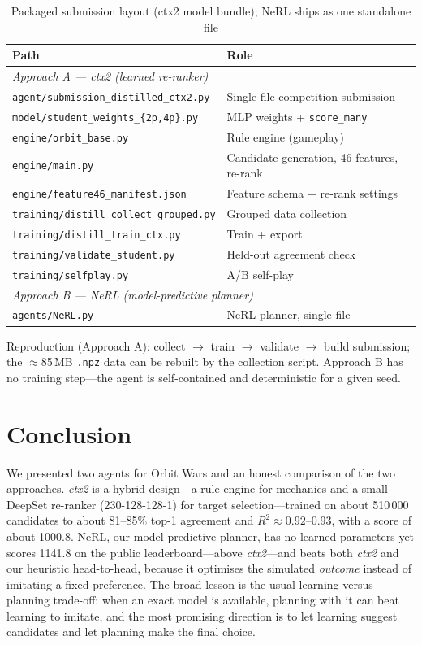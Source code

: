 \documentclass[conference]{IEEEtran}
\begin{document}
\begin{table}[htbp]
\caption{Packaged submission layout (ctx2 model bundle); NeRL ships as one standalone file}
\label{tab:files}
\centering
\small
\begin{tabular}{lp{5.4cm}}
\toprule
\textbf{Path} & \textbf{Role} \\
\midrule
\multicolumn{2}{l}{\textit{Approach A --- ctx2 (learned re-ranker)}} \\
\texttt{agent/submission\_distilled\_ctx2.py} & Single-file competition submission \\
\texttt{model/student\_weights\_\{2p,4p\}.py} & MLP weights + \texttt{score\_many} \\
\texttt{engine/orbit\_base.py} & Rule engine (gameplay) \\
\texttt{engine/main.py} & Candidate generation, 46 features, re-rank \\
\texttt{engine/feature46\_manifest.json} & Feature schema + re-rank settings \\
\texttt{training/distill\_collect\_grouped.py} & Grouped data collection \\
\texttt{training/distill\_train\_ctx.py} & Train + export \\
\texttt{training/validate\_student.py} & Held-out agreement check \\
\texttt{training/selfplay.py} & A/B self-play \\
\midrule
\multicolumn{2}{l}{\textit{Approach B --- NeRL (model-predictive planner)}} \\
\texttt{agents/NeRL.py} & NeRL planner, single file \\
\bottomrule
\end{tabular}
\end{table}

Reproduction (Approach A): collect $\rightarrow$ train $\rightarrow$ validate $\rightarrow$ build submission; the $\approx$85\,MB \texttt{.npz} data can be rebuilt by the collection script. Approach B has no training step---the agent is self-contained and deterministic for a given seed.

\section{Conclusion}

We presented two agents for Orbit Wars and an honest comparison of the two approaches. \textit{ctx2} is a hybrid design---a rule engine for mechanics and a small DeepSet re-ranker (230-128-128-1) for target selection---trained on about 510\,000 candidates to about 81--85\% top-1 agreement and $R^2 \approx 0.92$--0.93, with a score of about 1000.8. NeRL, our model-predictive planner, has no learned parameters yet scores 1141.8 on the public leaderboard---above \textit{ctx2}---and beats both \textit{ctx2} and our heuristic head-to-head, because it optimises the simulated \emph{outcome} instead of imitating a fixed preference. The broad lesson is the usual learning-versus-planning trade-off: when an exact model is available, planning with it can beat learning to imitate, and the most promising direction is to let learning suggest candidates and let planning make the final choice.
\end{document}
